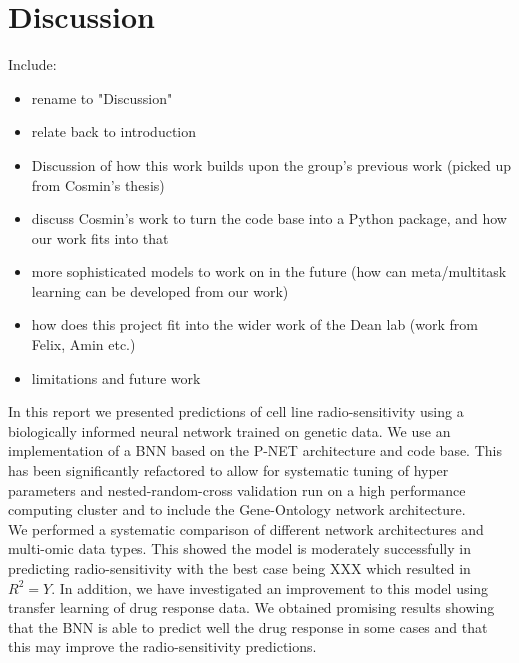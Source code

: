 \documentclass[NOTE, disdraft=true, UKenglish]{\DISCDTLATEXPATH UCLCDTDISdoc}
\begin{document}
\section{Discussion}
\label{sec:conclusion}
{   \color{red}
Include:
\begin{itemize}
\item rename to "Discussion"
\item relate back to introduction
\item Discussion of how this work builds upon the group's previous work (picked up from Cosmin's thesis)
\item discuss Cosmin's work to turn the code base into a Python package, and how our work fits into that
\item more sophisticated models to work on in the future (how can meta/multitask learning can be developed from our work)
\item how does this project fit into the wider work of the Dean lab (work from Felix, Amin etc.)
\item limitations and future work
\end{itemize}}
In this report we presented predictions of cell line radio-sensitivity using a biologically informed neural network trained on genetic data. We use an implementation of a BNN based on the P-NET architecture and code base. This has been significantly refactored to allow for systematic tuning of hyper parameters and nested-random-cross validation run on a high performance computing cluster and to include the Gene-Ontology network architecture. 
\\ \indent 
We performed a systematic comparison of different network architectures and multi-omic data types. This showed the model is moderately successfully in predicting radio-sensitivity with the best case being XXX which resulted in $R^2=Y$. In addition, we have investigated an improvement to this model using transfer learning of drug response data. We obtained promising results showing that the BNN is able to predict well the drug response in some cases and that this may improve the radio-sensitivity predictions.
\printbibliography
%
\end{document}
